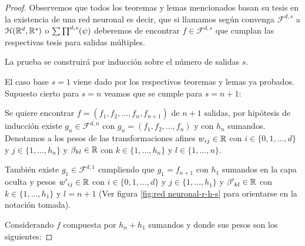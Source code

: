 \begin{proof}
    Observemos que todos los teoremas y lemas mencionados basan su tesis
    en la existencia de una red neuronal es decir, que si llamamos según 
    convenga $\mathcal{F}^{d,s}$ a $\mathcal{H}(\mathbb{R}^d,\mathbb{R}^s)$ o $\sum \prod^{d,s} (\psi)$ deberemos de 
    encontrar $f \in \mathcal{F}^{d,s}$ que cumplan las respectivas tesis para salidas múltiples. 

    La prueba se construirá por inducción sobre el número de salidas $s$. 

\reversemarginpar
\setlength{\marginparwidth}{\smallMarginSize}

\normalmarginpar
\setlength{\marginparwidth}{\bigMarginSize}

    El caso base $s=1$ viene dado por los respectivos teoremas y lemas ya probados.
    Supuesto cierto para $s = n$ veamos que se cumple para $s=n+1$: 
    
    Se quiere encontrar 
    $f = (f_1, f_2, \ldots, f_n, f_{n+1})$ de $n+1$ salidas, 
    por hipótesis de inducción existe $g_n \in \mathcal{F}^{d,n}$ con
     $g_n = (f_1, f_2, \ldots, f_n)$ y con $h_n$ sumandos. Denotamos a los pesos de las transformaciones afines 
     $w_{i j} \in \mathbb{R}$ con 
     $i \in \{0, 1, \ldots , d \}$  y  $j \in \{1, \ldots ,h_n \}$ 
     y $\beta_{ k l} \in \mathbb{R}$ con 
     $k \in \{1, \ldots ,h_n \}$  y  $l \in \{1, \ldots ,n \}.$

    También existe $g_1 \in \mathcal{F}^{d,1}$ cumpliendo que
    $g_1 = f_{n+1}$ con $h_1$ sumandos en la capa oculta
    y pesos  
    ${w'}_{i j} \in \mathbb{R}$ con 
     $i \in \{0, 1, \ldots , d \}$  y  $j \in \{1, \ldots , h_1 \}$ 
     y ${\beta '}_{ k l} \in \mathbb{R}$ con 
     $k \in \{1, \ldots , h_1 \}$  y  $l = {n+1}$
     (Ver figura \ref{fig:red neuronal-r-h-s} para orientarse en la notación tomada).
     
    Considerando $f$ compuesta por $h_n + h_1$ sumandos y donde sus pesos son los siguientes:


\end{proof}
